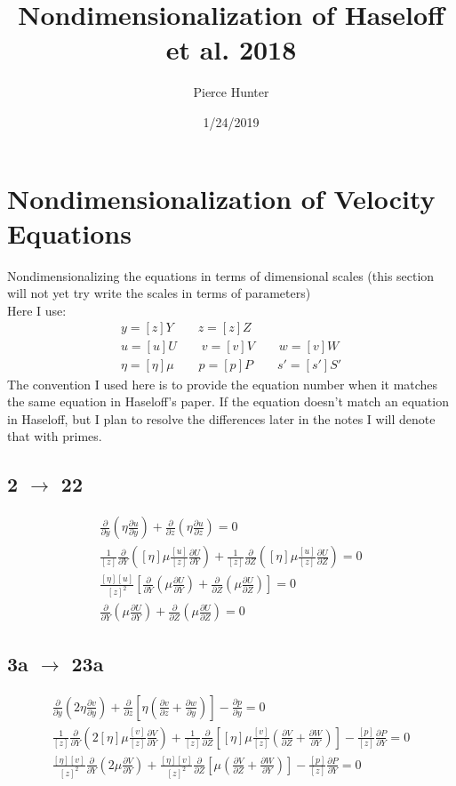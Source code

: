 \documentclass[10pt, letterpaper, twoside]{article}
\title{Nondimensionalization of Haseloff et al. 2018}
\author{Pierce Hunter}
\date{1/24/2019}
\newcommand{\pd}[2]{\frac{\partial#1}{\partial#2}}
\begin{document}
	\maketitle
	
	\section{Nondimensionalization of Velocity Equations}
	Nondimensionalizing the equations in terms of dimensional scales (this section will not yet try write the scales in terms of parameters)\\
	Here I use:
	\begin{gather*}
		y = \left[z\right]Y \qquad
		z = \left[z\right]Z\\
		u = \left[u\right]U \qquad
		v = \left[v\right]V \qquad
		w = \left[v\right]W\\
		\eta = \left[\eta\right]\mu \qquad
		p = \left[p\right]P \qquad
		s' = \left[s'\right]S'
	\end{gather*}
	The convention I used here is to provide the equation number when it matches the same equation in Haseloff's paper. If the equation doesn't match an equation in Haseloff, but I plan to resolve the differences later in the notes I will denote that with primes.
	\subsection{2 $ \rightarrow $ 22}
	\begin{gather*}
		\pd{}{y}\left(\eta\pd{u}{y}\right) + \pd{}{z}\left(\eta\pd{u}{z}\right) = 0 \tag{2} \\
		\frac{1}{\left[z\right]}\pd{}{Y}\left(\left[\eta\right]\mu\frac{\left[u\right]}{\left[z\right]}\pd{U}{Y}\right) + \frac{1}{\left[z\right]}\pd{}{Z}\left(\left[\eta\right]\mu\frac{\left[u\right]}{\left[z\right]}\pd{U}{Z}\right) = 0\\
		\frac{\left[\eta\right]\left[u\right]}{\left[z\right]^2}\left[\pd{}{Y}\left(\mu\pd{U}{Y}\right) + \pd{}{Z}\left(\mu\pd{U}{Z}\right)\right] = 0\\
		\pd{}{Y}\left(\mu\pd{U}{Y}\right) + \pd{}{Z}\left(\mu\pd{U}{Z}\right) = 0 \tag{22}
	\end{gather*}
	\subsection{3a $ \rightarrow $ 23a}
	\begin{gather*}
		\pd{}{y}\left(2\eta\pd{v}{y}\right) + \pd{}{z}\left[\eta\left(\pd{v}{z}+\pd{w}{y}\right)\right] - \pd{p}{y} = 0 \tag{3a} \\
		\frac{1}{\left[z\right]}\pd{}{Y}\left(2\left[\eta\right]\mu\frac{\left[v\right]}{\left[z\right]}\pd{V}{Y}\right) + \frac{1}{\left[z\right]}\pd{}{Z}\left[\left[\eta\right]\mu\frac{\left[v\right]}{\left[z\right]}\left(\pd{V}{Z}+\pd{W}{Y}\right)\right] - \frac{\left[p\right]}{\left[z\right]}\pd{P}{Y} = 0\\
		\frac{\left[\eta\right]\left[v\right]}{\left[z\right]^2}\pd{}{Y}\left(2\mu\pd{V}{Y}\right) + \frac{\left[\eta\right]\left[v\right]}{\left[z\right]^2}\pd{}{Z}\left[\mu\left(\pd{V}{Z}+\pd{W}{Y}\right)\right] - \frac{\left[p\right]}{\left[z\right]}\pd{P}{Y} = 0 \tag{3a$'$}
	\end{gather*}
\end{document}

